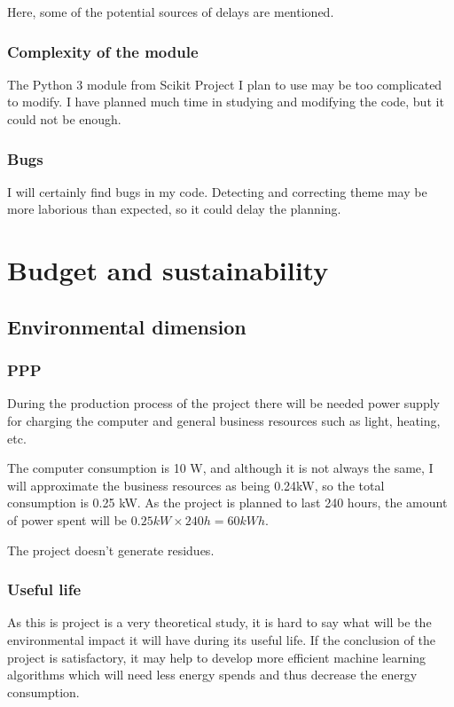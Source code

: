 \documentclass[a4paper]{article}
\begin{document}
        Here, some of the potential sources of delays are mentioned.

        \subsubsection{Complexity of the module}
        The Python 3 module from Scikit Project I plan to use may be too complicated to modify. I have planned much time in studying and modifying the code, but it could not be enough.

        \subsubsection{Bugs}
        I will certainly find bugs in my code. Detecting and correcting theme may be more laborious than expected, so it could delay the planning.



    \section{Budget and sustainability}
        \subsection{Environmental dimension}
            \subsubsection{PPP}
                During the production process of the project there will be needed power supply for charging the computer and general business resources such as light, heating, etc.

                The computer consumption is 10 W, and although it is not always the same, I will approximate the business resources as being 0.24kW, so the total consumption is 0.25 kW. As the project is planned to last 240 hours, the amount of power spent will be \(0.25 kW \times 240 h = 60 kWh\).

                The project doesn't generate residues.
            \subsubsection{Useful life}
                As this is project is a very theoretical study, it is hard to say what will be the environmental impact it will have during its useful life. If the conclusion of the project is satisfactory, it may help to develop more efficient machine learning algorithms which will need less energy spends and thus decrease the energy consumption.
\end{document}
